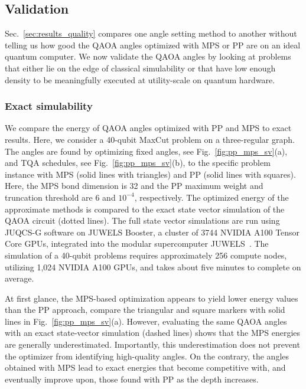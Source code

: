 \documentclass[twocolumn,
english,
aps,
pra,
10pt,
longbibliography,
superscriptaddress,
amsmath,
amssymb,
floatfix
]{revtex4-2}
\begin{document}
{\subsection{Validation\label{sec:results_validation}}

Sec.~\ref{sec:results_quality} compares one angle setting method to another without telling us how good the QAOA angles optimized with MPS or PP are on an ideal quantum computer.
We now validate the QAOA angles by looking at problems that either lie on the edge of classical simulability or that have low enough density to be meaningfully executed at utility-scale on quantum hardware.

\subsubsection{Exact simulability\label{sec:exact_sv_40q}}

We compare the energy of QAOA angles optimized
with PP and MPS to exact results.
Here, we consider a 40-qubit MaxCut problem on a three-regular graph.
The angles are found by optimizing fixed angles, see Fig.~\ref{fig:pp_mps_sv}(a), and TQA schedules, see Fig.~\ref{fig:pp_mps_sv}(b), to the specific problem instance with MPS (solid lines with triangles) and PP (solid lines with squares).
Here, the MPS bond dimension is 32 and the PP maximum weight and truncation threshold are 6 and $10^{-4}$, respectively.
The optimized energy of the approximate methods is compared to the exact state vector simulation of the QAOA circuit (dotted lines).
The full state vector simulations are run using JUQCS-G software \cite{Willsch2022} on JUWELS Booster, a cluster of 3744 NVIDIA A100 Tensor Core GPUs, integrated into the modular supercomputer JUWELS~\cite{Krause2019, JuwelsClusterBooster}.
The simulation of a 40-qubit problems requires approximately 256 compute nodes, utilizing 1,024 NVIDIA A100 GPUs, and takes about five minutes to complete on average.

At first glance, the MPS-based optimization appears to yield lower energy values than the PP approach, compare the triangular and square markers with solid lines in Fig.~\ref{fig:pp_mps_sv}(a). 
However, evaluating the same QAOA angles with an exact state-vector simulation (dashed lines) shows that the MPS energies are generally underestimated. 
Importantly, this underestimation does not prevent the optimizer from identifying high-quality angles. 
On the contrary, the angles obtained with MPS lead to exact energies that become competitive with, and eventually improve upon, those found with PP as the depth increases.

}
\end{document}
